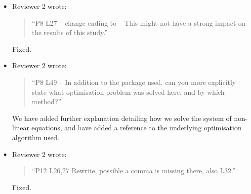 \documentclass{article}
\begin{document}
\begin{itemize}
\item Reviewer 2 wrote:
\begin{quote}
``P8 L27 – change ending to – This might not have a strong impact on the results of this study.''
\end{quote}
Fixed.

\item Reviewer 2 wrote:
\begin{quote}
``P8 L49 – In addition to the package used, can you more explicitly state what optimisation problem was solved here, and by which method?''
\end{quote}
We have added further explanation detailing how we solve the system of non-linear equations, and have added a reference to the underlying optimisation algorithm used.

\item Reviewer 2 wrote:
\begin{quote}
``P12 L26,27 Rewrite, possible a comma is missing there, also L32.''
\end{quote}
Fixed.

\end{itemize}
\end{document}
